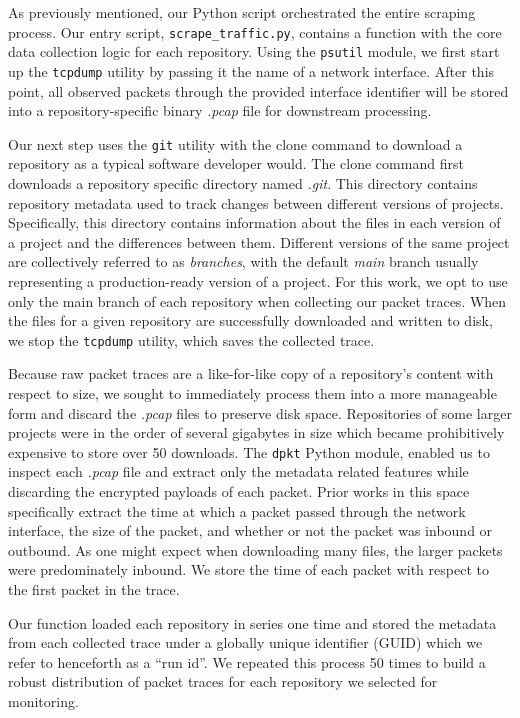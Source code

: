\documentclass[sigconf,authorversion,nonacm]{acmart}
\begin{document}
As previously mentioned, our Python script orchestrated the entire scraping process. Our entry script, \texttt{scrape\_traffic.py}, contains a function with the core data collection logic for each repository. Using the \texttt{psutil} module, we first start up the \texttt{tcpdump} utility by passing it the name of a network interface. After this point, all observed packets through the provided interface identifier will be stored into a repository-specific binary \textit{.pcap} file for downstream processing. 

Our next step uses the \texttt{git} utility with the clone command to download a repository as a typical software developer would. The clone command first downloads a repository specific directory named \textit{.git}. This directory contains repository metadata used to track changes between different versions of projects. Specifically, this directory contains information about the files in each version of a project and the differences between them. Different versions of the same project are collectively referred to as \textit{branches}, with the default \textit{main} branch usually representing a production-ready version of a project. For this work, we opt to use only the main branch of each repository when collecting our packet traces. When the files for a given repository are successfully downloaded and written to disk, we stop the \texttt{tcpdump} utility, which saves the collected trace.

Because raw packet traces are a like-for-like copy of a repository's content with respect to size, we sought to immediately process them into a more manageable form and discard the \textit{.pcap} files to preserve disk space. Repositories of some larger projects were in the order of several gigabytes in size which became prohibitively expensive to store over 50 downloads. The \texttt{dpkt} Python module, enabled us to inspect each \textit{.pcap} file and extract only the metadata related features while discarding the encrypted payloads of each packet. Prior works in this space specifically extract the time at which a packet passed through the network interface, the size of the packet, and whether or not the packet was inbound or outbound. As one might expect when downloading many files, the larger packets were predominately inbound. We store the time of each packet with respect to the first packet in the trace.

Our function loaded each repository in series one time and stored the metadata from each collected trace under a globally unique identifier (GUID) which we refer to henceforth as a ``run id''. We repeated this process 50 times to build a robust distribution of packet traces for each repository we selected for monitoring. 
\end{document}
